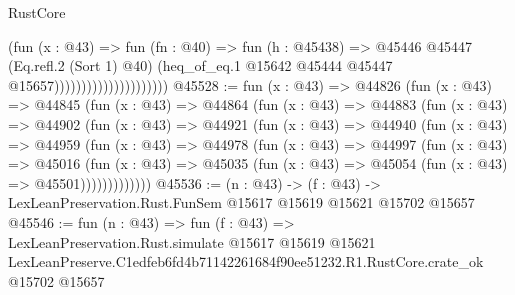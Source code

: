 \begin{lexlean}{RustCore}
\begin{coremodule}
                                          (fun (x : @43) =>
                                          fun (fn : @40) =>
                                          fun (h : @45438) =>
                                          @45446
                                            @45447
                                            (Eq.refl.{2} (Sort 1) @40)
                                            (heq_of_eq.{1}
                                              @15642
                                              @45444
                                              @45447
                                              @15657)))))))))))))))))))))
@45528 := fun (x : @43) =>
  @44826
    (fun (x : @43) =>
    @44845
      (fun (x : @43) =>
      @44864
        (fun (x : @43) =>
        @44883
          (fun (x : @43) =>
          @44902
            (fun (x : @43) =>
            @44921
              (fun (x : @43) =>
              @44940
                (fun (x : @43) =>
                @44959
                  (fun (x : @43) =>
                  @44978
                    (fun (x : @43) =>
                    @44997
                      (fun (x : @43) =>
                      @45016
                        (fun (x : @43) =>
                        @45035 (fun (x : @43) => @45054 (fun (x : @43) => @45501)))))))))))))
@45536 := (n : @43) ->
  (f : @43) -> LexLeanPreservation.Rust.FunSem @15617 @15619 @15621 @15702 @15657
@45546 := fun (n : @43) =>
  fun (f : @43) =>
  LexLeanPreservation.Rust.simulate
    @15617
    @15619
    @15621
    LexLeanPreserve.C1edfeb6fd4b71142261684f90ee51232.R1.RustCore.crate_ok
    @15702
    @15657
\end{coremodule}
\end{lexlean}
